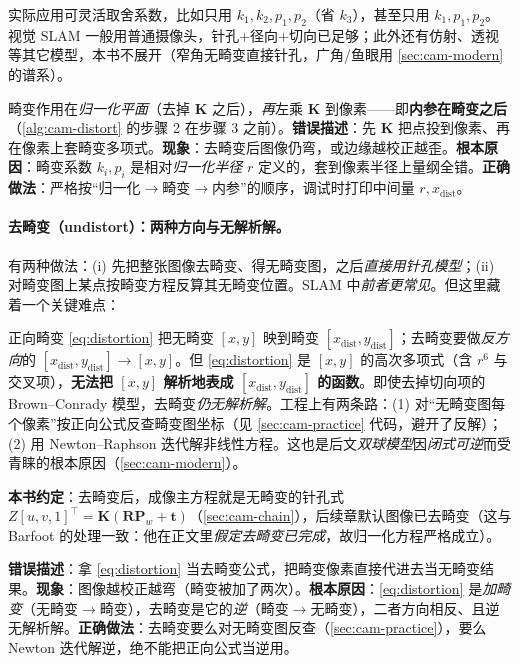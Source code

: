 \noindent 实际应用可灵活取舍系数，比如只用 $k_1,k_2,p_1,p_2$（省 $k_3$），甚至只用 $k_1,p_1,p_2$\cite{gaoxiang2019slam14}。视觉 SLAM 一般用普通摄像头，针孔$+$径向$+$切向已足够；此外还有仿射、透视等其它模型，本书不展开（窄角无畸变直接针孔，广角/鱼眼用 \cref{sec:cam-modern} 的谱系）。

\begin{pitfall}[畸变的作用顺序]
畸变作用在\emph{归一化平面}（去掉 $\mathbf{K}$ 之后），\emph{再}左乘 $\mathbf{K}$ 到像素——即\textbf{内参在畸变之后}（\cref{alg:cam-distort} 的步骤 2 在步骤 3 之前）。\textbf{错误描述}：先 $\mathbf{K}$ 把点投到像素、再在像素上套畸变多项式。\textbf{现象}：去畸变后图像仍弯，或边缘越校正越歪。\textbf{根本原因}：畸变系数 $k_i,p_i$ 是相对\emph{归一化半径} $r$ 定义的，套到像素半径上量纲全错。\textbf{正确做法}：严格按“归一化$\to$畸变$\to$内参”的顺序，调试时打印中间量 $r,x_{\text{dist}}$。
\end{pitfall}

\paragraph{去畸变（undistort）：两种方向与无解析解。}
有两种做法\cite{gaoxiang2019slam14}：(i) 先把整张图像去畸变、得无畸变图，之后\emph{直接用针孔模型}；(ii) 对畸变图上某点按畸变方程反算其无畸变位置。SLAM 中\emph{前者更常见}。但这里藏着一个关键难点：

\begin{insight}[径向-切向模型的去畸变没有解析解]
正向畸变 \cref{eq:distortion} 把无畸变 $[x,y]$ 映到畸变 $[x_{\text{dist}},y_{\text{dist}}]$；去畸变要做\emph{反方向}的 $[x_{\text{dist}},y_{\text{dist}}]\to[x,y]$。但 \cref{eq:distortion} 是 $[x,y]$ 的高次多项式（含 $r^6$ 与交叉项），\textbf{无法把 $[x,y]$ 解析地表成 $[x_{\text{dist}},y_{\text{dist}}]$ 的函数}\cite{carlone2026handbook}。即使去掉切向项的 Brown--Conrady 模型，去畸变\emph{仍无解析解}。工程上有两条路：(1) 对“无畸变图每个像素”按正向公式反查畸变图坐标（见 \cref{sec:cam-practice} 代码，避开了反解）；(2) 用 Newton--Raphson 迭代解非线性方程。这也是后文\emph{双球模型}因\emph{闭式可逆}而受青睐的根本原因（\cref{sec:cam-modern}）。
\end{insight}

\textbf{本书约定}：去畸变后，成像主方程就是无畸变的针孔式 $Z[u,v,1]^\top=\mathbf{K}(\mathbf{R}\mathbf{P}_w+\mathbf{t})$（\cref{sec:cam-chain}），后续章默认图像已去畸变（这与 Barfoot 的处理一致：他在正文里\emph{假定去畸变已完成}，故归一化方程严格成立\cite{barfoot2024state}）。

\begin{pitfall}
\textbf{错误描述}：拿 \cref{eq:distortion} 当去畸变公式，把畸变像素直接代进去当无畸变结果。\textbf{现象}：图像越校正越弯（畸变被加了两次）。\textbf{根本原因}：\cref{eq:distortion} 是\emph{加畸变}（无畸变$\to$畸变），去畸变是它的\emph{逆}（畸变$\to$无畸变），二者方向相反、且逆无解析解。\textbf{正确做法}：去畸变要么对无畸变图反查（\cref{sec:cam-practice}），要么 Newton 迭代解逆，绝不能把正向公式当逆用。
\end{pitfall}

